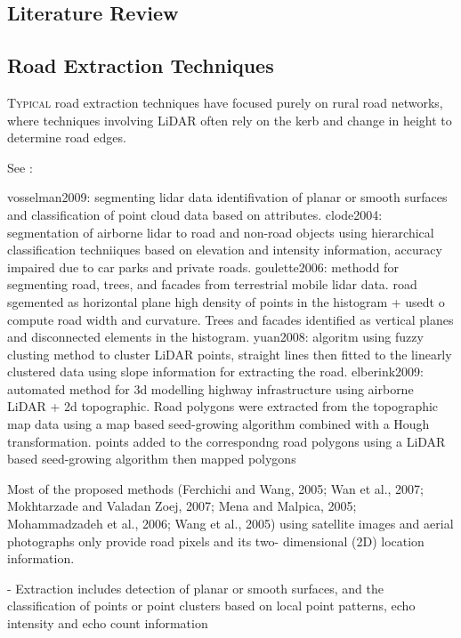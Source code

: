 \begin{multicols}{2}
\section{Literature Review}
\label{sec:literature}

\subsection{Road Extraction Techniques}

\lettrine{T}{ypical} road extraction techniques have focused purely on rural road networks, where techniques involving LiDAR often rely on the kerb and change in height to determine road edges.

See \citep{kumar2013}:

vosselman2009: segmenting lidar data identifivation of planar or smooth surfaces and classification of point cloud data based on attributes.
clode2004: segmentation of airborne lidar to road and non-road objects using hierarchical classification techniiques based on elevation and intensity information, accuracy impaired due to car parks and private roads.
goulette2006: methodd for segmenting road, trees, and facades from terrestrial mobile lidar data. road sgemented as horizontal plane high density of points in the histogram + usedt o compute road width and curvature. Trees and facades identified as vertical planes and disconnected elements in the histogram.
yuan2008: algoritm using fuzzy clusting method to cluster LiDAR points, straight lines then fitted to the linearly clustered data using slope information for extracting the road.
elberink2009: automated method for 3d modelling highway infrastructure using airborne LiDAR + 2d topographic. Road polygons were extracted from the topographic map data using a map based seed-growing algorithm combined with a Hough transformation. points added to the correspondng road polygons using a LiDAR based seed-growing algorithm then mapped polygons

Most of the proposed methods (Ferchichi and Wang, 2005; Wan et al., 2007; Mokhtarzade and Valadan Zoej, 2007; Mena and Malpica, 2005; Mohammadzadeh et al., 2006; Wang et al., 2005) using satellite images and aerial photographs only provide road pixels and its two- dimensional (2D) location information.

- Extraction includes detection of planar or smooth surfaces, and the classification of points or point clusters based on local point patterns, echo intensity and echo count information \citep{vosselman2004;darmawati2008}


\end{multicols}
